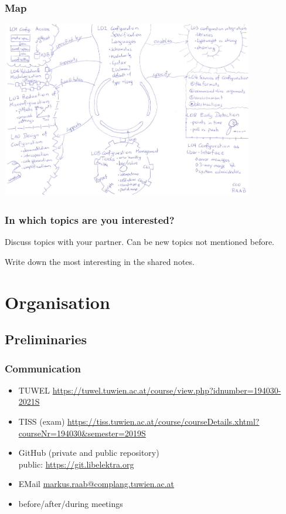 \begin{frame}
	\frametitle{Map}

	\includegraphics[width=11cm]{pics/map.pdf}
\end{frame}

\begin{assignment}
	\frametitle{In which topics are you interested?}
	\begin{task}[1]
	Discuss topics with your partner.
	Can be new topics not mentioned before.
	\end{task}

	\begin{task}[2]
	Write down the most interesting in the shared notes.
	\end{task}
\end{assignment}





\section{Organisation}

\subsection{Preliminaries}
\begin{frame}
	\frametitle{Communication}
	\begin{itemize}
		\item TUWEL \url{https://tuwel.tuwien.ac.at/course/view.php?idnumber=194030-2021S}
		\item TISS (exam) \url{https://tiss.tuwien.ac.at/course/courseDetails.xhtml?courseNr=194030&semester=2019S}
		\item GitHub (private and public repository) \\ public: \url{https://git.libelektra.org}
		\item EMail \url{markus.raab@complang.tuwien.ac.at}
		\item before/after/during meetings
	\end{itemize}
\end{frame}

